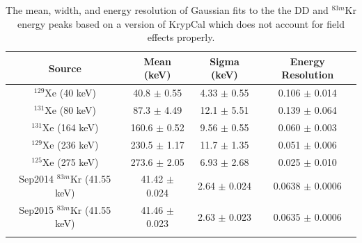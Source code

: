\begin{longtable}{|  c | c | c | c |} 
\hline
Source & Mean (keV) & Sigma (keV) & Energy Resolution \\ \hline \hline
$^{129}$Xe (40 keV) & 40.8 $\pm$ 0.55  & 4.33 $\pm$ 0.55 & 0.106 $\pm$ 0.014 \\ \hline

$^{131}$Xe (80 keV) & 87.3  $\pm$ 4.49  & 12.1  $\pm$ 5.51 & 0.139  $\pm$ 0.064 \\ \hline

$^{131}$Xe (164 keV) & 160.6  $\pm$ 0.52  & 9.56  $\pm$ 0.55 & 0.060  $\pm$ 0.003  \\ \hline
 
$^{129}$Xe (236 keV) & 230.5  $\pm$ 1.17 & 11.7  $\pm$ 1.35  & 0.051  $\pm$ 0.006  \\ \hline

$^{125}$Xe (275 keV) & 273.6 $\pm$ 2.05 & 6.93   $\pm$ 2.68 & 0.025   $\pm$ 0.010  \\ \hline
 
Sep2014 $^{83m}$Kr (41.55 keV) & 41.42   $\pm$ 0.024 & 2.64 $\pm$ 0.024 & 0.0638  $\pm$ 0.0006  \\ \hline
  
Sep2015 $^{83m}$Kr (41.55 keV) & 41.46   $\pm$ 0.023 & 2.63  $\pm$ 0.023  & 0.0635  $\pm$ 0.0006  \\ \hline

\caption{The mean, width, and energy resolution of Gaussian fits to the the DD and $^{83m}$Kr energy peaks based on a version of KrypCal which does not account for field effects properly.}
\label{EnergyRes1}
\end{longtable}


